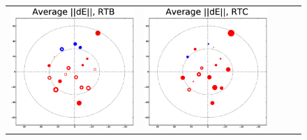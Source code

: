 \documentclass[]{article}
\begin{document}
\begin{figure}
\begin{tabular}{@{}c@{}c@{}c@{}c@{}c@{}}
\includegraphics[width=\roguewidth]{qmc2b_dE_antB} &
\includegraphics[width=\roguewidth]{qmc2b_dE_antC} &

\end{tabular}
\end{figure}
\end{document}
